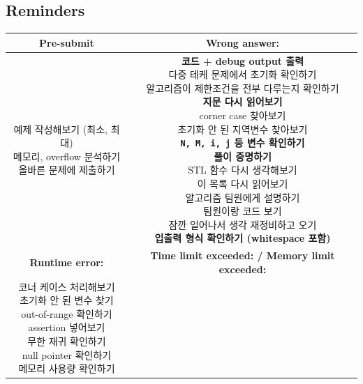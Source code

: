 \documentclass[landscape, 8pt, a4paper, oneside, twocolumn]{extarticle}
\begin{document}
\subsection*{Reminders}

\begin{table}[H]
    \centering
    \begin{tabular}{|c|c|}
        \hline
        \textbf{Pre-submit} & \textbf{Wrong answer:} \\ \hline
        \makecell{
            예제 작성해보기 (최소, 최대)\\
            메모리, overflow 분석하기 \\
            올바른 문제에 제출하기
        } &
        \makecell{
            \textbf{코드 + debug output 출력} \\
            다중 테케 문제에서 초기화 확인하기 \\
            알고리즘이 제한조건을 전부 다루는지 확인하기 \\
            \textbf{지문 다시 읽어보기} \\ 
            corner case 찾아보기 \\
            초기화 안 된 지역변수 찾아보기 \\
            \textbf{\texttt{N, M, i, j} 등 변수 확인하기} \\
            \textbf{풀이 증명하기} \\
            STL 함수 다시 생각해보기 \\
            이 목록 다시 읽어보기 \\
            알고리즘 팀원에게 설명하기 \\
            팀원이랑 코드 보기 \\
            잠깐 일어나서 생각 재정비하고 오기 \\
            \textbf{입출력 형식 확인하기 (whitespace 포함)}
        } \\ \hline
        \textbf{Runtime error:} & \textbf{Time limit exceeded: / Memory limit exceeded:} \\ \hline
        \makecell{
            코너 케이스 처리해보기 \\
            초기화 안 된 변수 찾기 \\
            out-of-range 확인하기 \\
            assertion 넣어보기 \\
            무한 재귀 확인하기 \\
            null pointer 확인하기 \\
            메모리 사용량 확인하기
}
\end{tabular}
\end{table}
\end{document}
